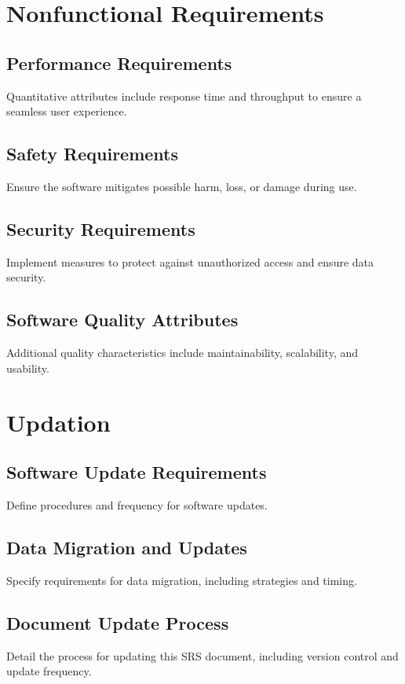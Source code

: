 \documentclass{article}
\begin{document}

\newpage
\section{Nonfunctional Requirements}
\subsection{Performance Requirements}
Quantitative attributes include response time and throughput to ensure a seamless user experience.

\subsection{Safety Requirements}
Ensure the software mitigates possible harm, loss, or damage during use.

\subsection{Security Requirements}
Implement measures to protect against unauthorized access and ensure data security.

\subsection{Software Quality Attributes}
Additional quality characteristics include maintainability, scalability, and usability.

\newpage
\section{Updation}
\subsection{Software Update Requirements}
Define procedures and frequency for software updates.

\subsection{Data Migration and Updates}
Specify requirements for data migration, including strategies and timing.

\subsection{Document Update Process}
Detail the process for updating this SRS document, including version control and update frequency.
\end{document}
